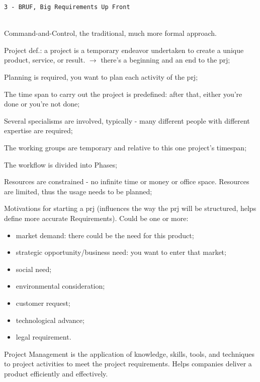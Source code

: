 
\begin{center}\texttt{3 - BRUF, Big Requirements Up Front}\end{center}
\hrulefill \\

\noindent Command-and-Control, the traditional, much more formal approach.

\noindent Project def.: a project is a temporary endeavor undertaken to create a unique product, service, or result. $\rightarrow$ there's a beginning and an end to the prj; 

\noindent Planning is required, you want to plan each activity of the prj;

\noindent The time span to carry out the project is predefined: after that, either you're done or you're not done;

\noindent Several specialisms are involved, typically -  many different people with different expertise are required;

\noindent The working groups are temporary and relative to this one project's timespan;

\noindent The workflow is divided into Phases;

\noindent Resources are constrained - no infinite time or money or office space. Resources are limited, thus the usage needs to be planned;

\noindent Motivations for starting a prj (influences the way the prj will be structured, helps define more accurate Requirements). Could be one or more:
\begin{itemize}
    \item market demand: there could be the need for this product;
    \item strategic opportunity/business need: you want to enter that market;
    \item social need;
    \item environmental consideration;
    \item customer request;
    \item technological advance;
    \item legal requirement.
\end{itemize}

\noindent Project Management is the application of knowledge, skills, tools, and techniques to project activities to meet the project requirements. Helps companies deliver a product efficiently and effectively. 

